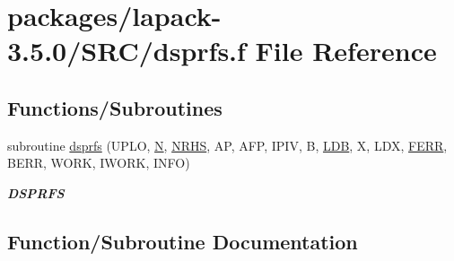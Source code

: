 \hypertarget{dsprfs_8f}{}\section{packages/lapack-\/3.5.0/\+S\+R\+C/dsprfs.f File Reference}
\label{dsprfs_8f}
\subsection*{Functions/\+Subroutines}
\begin{DoxyCompactItemize}
\item 
subroutine \hyperlink{dsprfs_8f_a494f27878d5670ad2570185062b96fc7}{dsprfs} (U\+P\+L\+O, \hyperlink{polmisc_8c_a0240ac851181b84ac374872dc5434ee4}{N}, \hyperlink{example__user_8c_aa0138da002ce2a90360df2f521eb3198}{N\+R\+H\+S}, A\+P, A\+F\+P, I\+P\+I\+V, B, \hyperlink{example__user_8c_a50e90a7104df172b5a89a06c47fcca04}{L\+D\+B}, X, L\+D\+X, \hyperlink{superlu__enum__consts_8h_af00a42ecad444bbda75cde1b64bd7e72a78fd14d7abebae04095cfbe02928f153}{F\+E\+R\+R}, B\+E\+R\+R, W\+O\+R\+K, I\+W\+O\+R\+K, I\+N\+F\+O)
\begin{DoxyCompactList}\small\item\em {\bfseries D\+S\+P\+R\+F\+S} \end{DoxyCompactList}\end{DoxyCompactItemize}


\subsection{Function/\+Subroutine Documentation}
\hypertarget{dsprfs_8f_a494f27878d5670ad2570185062b96fc7}{}
